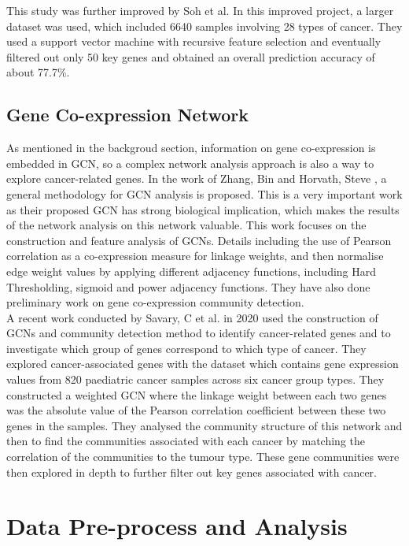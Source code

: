 \documentclass[12pt,a4paper]{report}
\begin{document}
This study was further improved by Soh et al. \cite{Soh17} In this improved project, a larger dataset was used, which included 6640 samples involving 28 types of cancer. They used a support vector machine with recursive feature selection and eventually filtered out only 50 key genes and obtained an overall prediction accuracy of about 77.7\%.
\section{Gene Co-expression Network}

As mentioned in the backgroud section, information on gene co-expression is embedded in GCN, so a complex network analysis approach is also a way to explore cancer-related genes. In the work of Zhang, Bin and Horvath, Steve \cite{Zha05}, a general methodology for GCN analysis is proposed. This is a very important work as their proposed GCN has strong biological implication, which makes the results of the network analysis on this network valuable. This work focuses on the construction and feature analysis of GCNs. Details including the use of Pearson correlation as a co-expression measure for linkage weights, and then normalise edge weight values by applying different adjacency functions, including Hard Thresholding, sigmoid and power adjacency functions. They have also done preliminary work on gene co-expression community detection.\\

A recent work conducted by Savary, C et al. \cite{Sav20} in 2020 used the construction of GCNs and community detection method to identify cancer-related genes and to investigate which group of genes correspond to which type of cancer. They explored cancer-associated genes with the dataset which contains gene expression values from 820 paediatric cancer samples across six cancer group types. They constructed a weighted GCN where the linkage weight between each two genes was the absolute value of the Pearson correlation coefficient between these two genes in the samples. They analysed the community structure of this network and then to find the communities associated with each cancer by matching the correlation of the communities to the tumour type. These gene communities were then explored in depth to further filter out key genes associated with cancer.\\




\chapter{Data Pre-process and Analysis}
\end{document}
